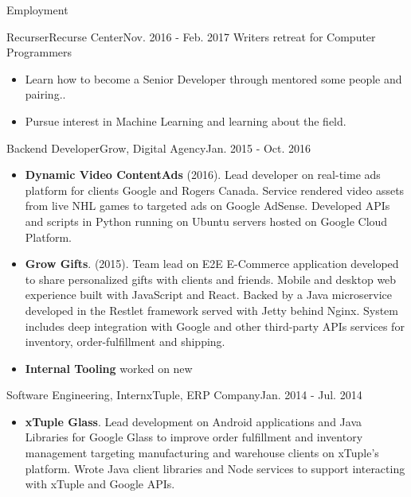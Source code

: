 \documentclass[]{mcdowellcv}
\begin{document}
	\makeheader

	\begin{cvsection}{Employment}

		\begin{cvsubsection}{Recurser}{Recurse Center}{Nov. 2016 - Feb. 2017}
			Writers retreat for Computer Programmers
			\begin{itemize}
				\item Learn how to become a Senior Developer through mentored some people and pairing..
				\item Pursue interest in Machine Learning and learning about the field.
			\end{itemize}
		\end{cvsubsection}

		\begin{cvsubsection}{Backend Developer}{Grow, Digital Agency}{Jan. 2015 - Oct. 2016}
			\begin{itemize}
				\item \textbf{Dynamic Video ContentAds} (2016). Lead developer on real-time ads platform for clients Google and Rogers Canada. Service rendered video assets from live NHL games to targeted ads on Google AdSense. Developed APIs and scripts in Python running on Ubuntu servers hosted on Google Cloud Platform.
			\end{itemize}
			\begin{itemize}
				\item \textbf{Grow Gifts}. (2015).  Team lead on E2E E-Commerce application developed to share personalized gifts with clients and friends. Mobile and desktop web experience built with JavaScript and React. Backed by a Java microservice developed in the Restlet framework served with Jetty behind Nginx. System includes deep integration with Google and other third-party APIs services for  inventory, order-fulfillment and shipping.
			\end{itemize}
			\begin{itemize}
				\item \textbf{Internal Tooling} worked on new
			\end{itemize}
		\end{cvsubsection}

		\begin{cvsubsection}{Software Engineering, Intern}{xTuple, ERP Company}{Jan. 2014 - Jul. 2014}
			\begin{itemize}
				\item \textbf{xTuple Glass}. Lead development on Android applications and Java Libraries for Google Glass to improve order fulfillment and inventory management targeting manufacturing and warehouse clients on xTuple’s platform. Wrote Java client libraries and Node services to support interacting with xTuple and Google APIs.
			\end{itemize}
		\end{cvsubsection}


\end{cvsection}
\end{document}
